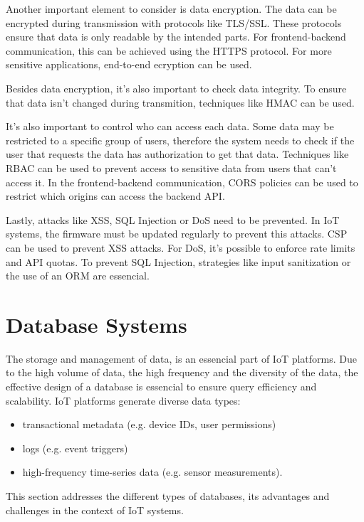 Another important element to consider is data encryption.
The data can be encrypted during transmission with protocols like \gls{TLS}/\gls{SSL}.
These protocols ensure that data is only readable by the intended parts.
For frontend-backend communication, this can be achieved using the \gls{HTTPS}
protocol.
For more sensitive applications, end-to-end ecryption can be used\cite{schiller2022landscape}.

Besides data encryption, it's also important to check data integrity.
To ensure that data isn't changed during transmition, techniques like
\gls{HMAC} can be used\cite{schiller2022landscape}.

It's also important to control who can access each data.
Some data may be restricted to a specific group of users, therefore the
system needs to check if the user that requests the data has
authorization to get that data. Techniques like \gls{RBAC} can be used to
prevent access to sensitive data from users that can't access it.
In the frontend-backend communication, \gls{CORS} policies can be used to
restrict which origins can access the backend \gls{API}.

Lastly, attacks like \gls{XSS}, \gls{SQL} Injection or \gls{DoS} need to be prevented.
In \gls{IoT} systems, the firmware must be updated regularly to prevent this
attacks.
\gls{CSP} can be used to prevent \gls{XSS} attacks. For \gls{DoS}, it's possible to enforce
rate limits and \gls{API} quotas. To prevent \gls{SQL} Injection, strategies like
input sanitization or the use of an \gls{ORM} are essencial\cite{schiller2022landscape}.

\section{Database Systems}
The storage and management of data, is an essencial part of \gls{IoT} platforms.
Due to the high volume of data, the high frequency and the diversity of the
data, the effective design of a database is essencial to ensure query efficiency
and scalability.
\gls{IoT} platforms generate diverse data types:
\begin{itemize}
	\item transactional metadata (e.g. device \gls{ID}s, user permissions)
	\item logs (e.g. event triggers)
	\item high-frequency time-series data (e.g. sensor measurements).
\end{itemize}

This section addresses the different types of databases, its advantages and
challenges in the context of \gls{IoT} systems.


